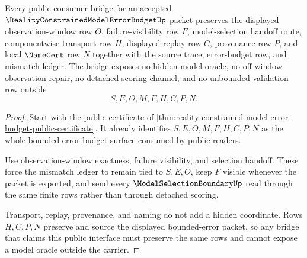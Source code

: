 \begin{theorem}
\label{thm:reality-constrained-model-error-budget-bridge-interface}
Every public consumer bridge for an accepted $\RealityConstrainedModelErrorBudgetUp$ packet preserves the displayed observation-window row $O$, failure-visibility row $F$, model-selection handoff route, componentwise transport row $H$, displayed replay row $C$, provenance row $P$, and local $\NameCert$ row $N$ together with the source trace, error-budget row, and mismatch ledger. The bridge exposes no hidden model oracle, no off-window observation repair, no detached scoring channel, and no unbounded validation row outside
$$
S,E,O,M,F,H,C,P,N.
$$
\end{theorem}
\begin{proof}
Start with the public certificate of \autoref{thm:reality-constrained-model-error-budget-public-certificate}. It already identifies $S,E,O,M,F,H,C,P,N$ as the whole bounded-error-budget surface consumed by public readers.

Use observation-window exactness, failure visibility, and selection handoff. These force the mismatch ledger to remain tied to $S,E,O$, keep $F$ visible whenever the packet is exported, and send every $\ModelSelectionBoundaryUp$ read through the same finite rows rather than through detached scoring.

Transport, replay, provenance, and naming do not add a hidden coordinate. Rows $H,C,P,N$ preserve and source the displayed bounded-error packet, so any bridge that claims this public interface must preserve the same rows and cannot expose a model oracle outside the carrier.
\end{proof}


